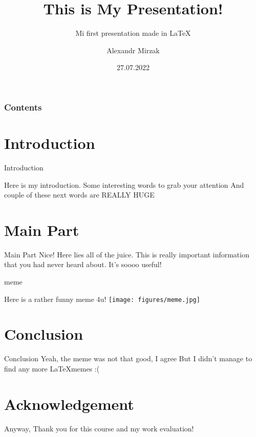 \documentclass[10pt]{beamer}
\title[Higher School of Economics]{This is My Presentation!
}
\subtitle{Mi first presentation made in \LaTeX}
\author[abc2-c]{Alexandr Mirzak}
\institute[@edu.hse.ru]{ National Research Insitute Higher School of Economics}
\date[27.07.2022]{27.07.2022}
\begin{document}
\frame{\titlepage}
\begin{frame}
\frametitle{Contents}
\tableofcontents
\end{frame}
\section{Introduction}
    \begin{frame}{Introduction}
    
    
    Here is my introduction. Some interesting words to grab your attention 
    And couple of these next words are \Huge REALLY HUGE 
    \end{frame}
    
\section{Main Part}
    \begin{frame}{Main Part}
    \Huge Nice!
    \Large Here lies all of the juice. This is really important information that you had never heard about. It's soooo useful!
    \end{frame}
    \begin{frame}{meme}
    \centerline{} Here is a rather funny meme 4u!
    \centering\texttt{[image: figures/meme.jpg]}
    \end{frame}


\section{Conclusion}
    \begin{frame}{Conclusion}
     \huge Yeah, the meme was not that good, I agree
     \tiny But I didn't manage to find any more \LaTeX memes :(
    \end{frame}



\section*{Acknowledgement}  
\begin{frame}
\textcolor{myNewColorA}{\large{\centerline{Anyway, Thank you for this course and my work evaluation!}}}
\end{frame}
\end{document}
